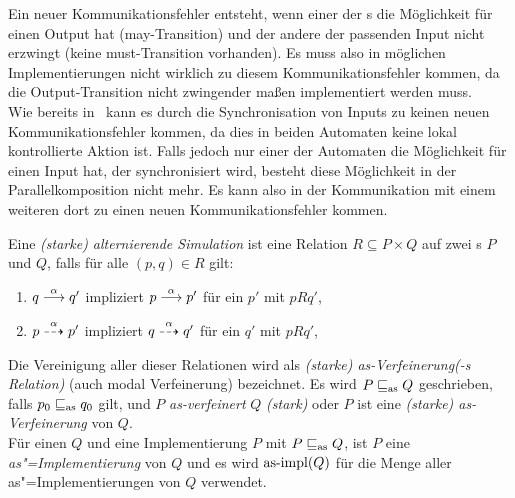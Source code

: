 Ein neuer Kommunikationsfehler entsteht, wenn einer der \MEIO{}s die
Möglichkeit für einen Output hat (may-Transition) und der andere \MEIO{} der
passenden Input nicht erzwingt (keine must-Transition vorhanden). Es muss also
in möglichen Implementierungen nicht wirklich zu diesem Kommunikationsfehler
kommen, da die Output-Transition nicht zwingender maßen implementiert werden
muss.\\
Wie bereits in~\cite{Schinko2016BA} kann es durch die Synchronisation von
Inputs zu keinen neuen Kommunikationsfehler kommen, da dies in beiden Automaten
keine lokal kontrollierte Aktion ist. Falls jedoch nur einer der Automaten die
Möglichkeit für einen Input hat, der synchronisiert wird, besteht diese
Möglichkeit in der Parallelkomposition nicht mehr. Es kann also in der
Kommunikation mit einem weiteren \MEIO{} dort zu einen neuen
Kommunikationsfehler kommen.

\begin{Def}
  \label{SimDef}
  Eine \emph{(starke) alternierende Simulation} ist eine Relation $R\subseteq P
  \times Q$ auf zwei \MEIO{}s $P$ und $Q$, falls für alle $(p,q)\in R$ gilt:
  \begin{enumerate}
    \item $q\must[\alpha] q'$ impliziert $p\must[\alpha] p'$ für ein $p'$ mit
      $pRq'$,
    \item $p\may[\alpha] p'$ impliziert $q\may[\alpha] q'$ für ein $q'$ mit
      $pRq'$,
  \end{enumerate}
  Die Vereinigung \asRel{} aller dieser Relationen wird als \emph{(starke)
  as-Verfeinerung(-s Relation)} (auch modal Verfeinerung) bezeichnet. Es wird
  $P\sqsubseteq _{\mathrm{as}} Q$ geschrieben, falls $p_0\sqsubseteq _{\mathrm{as}} q_0$ gilt, und $P$
  \emph{as-verfeinert} $Q$ \emph{(stark)} oder $P$ ist eine \emph{(starke)
  as-Verfeinerung} von $Q$.\\
  Für einen \MEIO{} $Q$ und eine Implementierung $P$ mit $P\sqsubseteq _{\mathrm{as}}{}Q$, ist
  $P$ eine \emph{as"=Implementierung} von $Q$ und es wird $\mathrm{as}\text{-}\mathrm{impl} (Q)$ für die
  Menge aller as"=Implementierungen von $Q$ verwendet.
\end{Def}

